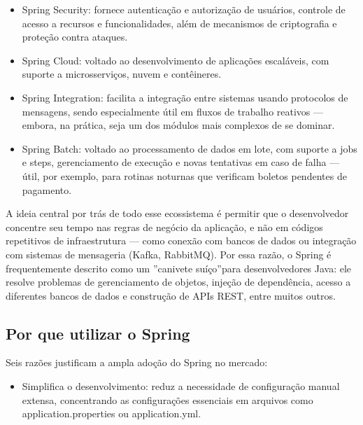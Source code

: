 \begin{itemize}
  \item Spring Security: fornece autenticação e autorização de usuários, controle de acesso a recursos e funcionalidades, além de mecanismos de criptografia e proteção contra ataques.
\end{itemize}

\begin{itemize}
  \item Spring Cloud: voltado ao desenvolvimento de aplicações escaláveis, com suporte a microsserviços, nuvem e contêineres.
\end{itemize}

\begin{itemize}
  \item Spring Integration: facilita a integração entre sistemas usando protocolos de mensagens, sendo especialmente útil em fluxos de trabalho reativos — embora, na prática, seja um dos módulos mais complexos de se dominar.
\end{itemize}

\begin{itemize}
  \item Spring Batch: voltado ao processamento de dados em lote, com suporte a jobs e steps, gerenciamento de execução e novas tentativas em caso de falha — útil, por exemplo, para rotinas noturnas que verificam boletos pendentes de pagamento.
\end{itemize}

A ideia central por trás de todo esse ecossistema é permitir que o desenvolvedor concentre seu tempo nas regras de negócio da aplicação, e não em códigos repetitivos de infraestrutura — como conexão com bancos de dados ou integração com sistemas de mensageria (Kafka, RabbitMQ). Por essa razão, o Spring é frequentemente descrito como um ”canivete suíço”para desenvolvedores Java: ele resolve problemas de gerenciamento de objetos, injeção de dependência, acesso a diferentes bancos de dados e construção de APIs REST, entre muitos outros.

\subsection{Por que utilizar o Spring}

Seis razões justificam a ampla adoção do Spring no mercado:

\begin{itemize}
  \item Simplifica o desenvolvimento: reduz a necessidade de configuração manual extensa, concentrando as configurações essenciais em arquivos como application.properties ou application.yml.
\end{itemize}

